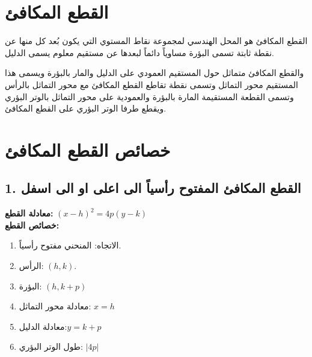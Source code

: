 \section{القطع المكافئ}

القطع المكافئ هو المحل الهندسي لمجموعة نقاط المستوي التي يكون بُعد كل منها عن نقطة ثابتة تسمى البؤرة مساوياً دائماً لبعدها عن مستقيم معلوم يسمى الدليل.

والقطع المكافئ متماثل حول المستقيم العمودي على الدليل والمار بالبؤرة ويسمى هذا المستقيم محور التماثل وتسمى نقطة تقاطع القطع المكافئ مع محور التماثل بالرأس وتسمى القطعة المستقيمة المارة بالبؤرة والعمودية على محور التماثل بالوتر البؤري ويقطع طرفا الوتر البؤري على القطع المكافئ.

\section{خصائص القطع المكافئ}

\subsection*{1. القطع المكافئ المفتوح رأسياً الى اعلى او الى اسفل}
\textbf{معادلة القطع:} \quad $(x-h)^2 = 4p(y-k)$\\[10pt]
\textbf{خصائص القطع:} 
\begin{enumerate}
	\item الاتجاه: \quad المنحني مفتوح رأسياً.
	\item الرأس: \quad $(h, k)$.
	\item البؤرة: \quad $(h, k+p)$
	\item معادلة محور التماثل:  \quad $x=h$
	\item معادلة الدليل:\quad $y=k+p$
	\item طول الوتر البؤري: \quad $|4p|$
\end{enumerate}

